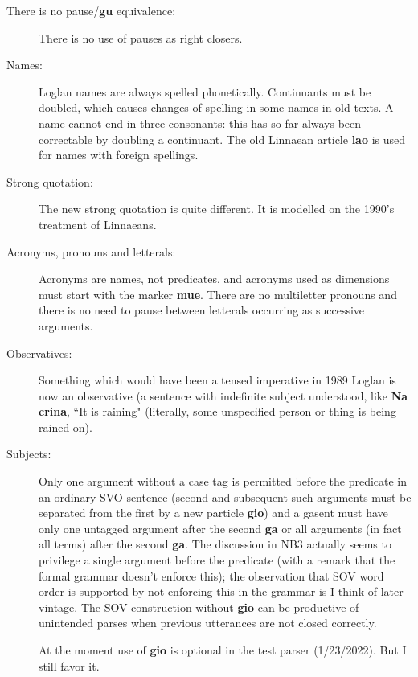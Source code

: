 \documentclass[12pt]{book}
\begin{document}
\begin{description}

\item[There is no pause/{\bf gu} equivalence:]  There is no use of pauses as right closers.  


\item[Names:]  Loglan names are always spelled phonetically.  Continuants must be doubled, which causes changes of spelling in some names in old texts.
A name cannot end in three consonants:  this has so far always been correctable by doubling a continuant.  The old Linnaean article {\bf lao} is used for names with foreign spellings.

\item[Strong quotation:]  The new strong quotation is quite different.   It is modelled on the 1990's treatment of Linnaeans.

\item[Acronyms, pronouns and letterals:]   Acronyms are names, not predicates, and acronyms used as dimensions must start with the marker {\bf mue}.  There are no multiletter pronouns and there is no need to pause between letterals occurring as successive arguments.


\item[Observatives:]   Something which would have been a tensed imperative in 1989 Loglan is now an observative (a sentence with indefinite subject understood, like {\bf Na crina}, ``It is raining" (literally, some unspecified person or thing is being rained on).

\item[Subjects:]  Only one argument without a case tag is permitted before the predicate in an ordinary SVO sentence (second and subsequent such arguments must be separated from the first by a new particle {\bf gio}) and a gasent must have only one untagged argument after the second {\bf ga} or all arguments (in fact all terms) after the second {\bf ga}.  The discussion in NB3 actually seems to privilege a single argument before the predicate (with a remark that the formal grammar doesn't enforce this);  the observation that SOV word order is supported by not enforcing this in the grammar is I think of later vintage.  The SOV construction without {\bf gio} can be productive of unintended parses when previous utterances are not closed correctly.

At the moment use of {\bf gio} is optional in the test parser (1/23/2022).  But I still favor it.




\end{description}
\end{document}

